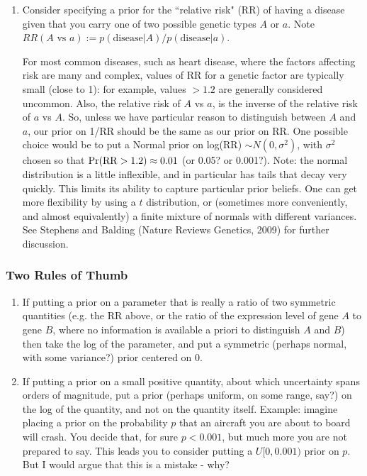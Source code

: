 \documentclass[12pt]{article}
\begin{document}
\begin{enumerate}
  \item Consider specifying a prior for the ``relative risk" (RR) of having a disease given that you carry one of two possible genetic types $A$ or $a$. Note $RR(A \mbox{ vs } a) := p(\mbox{disease} | A)/p(\mbox{disease} | a)$.
  
For most common diseases, such as heart disease, where the factors affecting risk
are many and complex, values of RR for a genetic factor are typically small (close to 1): for example, values $>1.2$ are generally considered uncommon. Also,
the relative risk of $A$ vs $a$, is the inverse of the relative risk of $a$ vs $A$.  So, unless we have particular reason to distinguish between $A$ and $a$, our prior on 1/RR should be the same as our prior on RR. One possible choice would be to put a Normal prior on log(RR) $\sim N(0,\sigma^2)$, with $\sigma^2$ chosen
so that $\Pr({\rm RR} >1.2) \approx 0.01$ (or 0.05? or 0.001?). 
Note: the normal distribution is a little inflexible,
and in particular has tails that decay very quickly.
This limits its ability to capture particular prior beliefs.
One can get more flexibility by using a $t$ distribution, or (sometimes more conveniently, and almost equivalently) a finite mixture of normals with different variances. See Stephens and Balding (Nature Reviews Genetics, 2009) for further discussion.
 \end{enumerate}

\subsubsection{Two Rules of Thumb}
\begin{enumerate}
\item If putting a prior on a parameter that is really a ratio of two symmetric quantities (e.g. the RR above, or the ratio
of the expression level of gene $A$ to gene $B$, where no information is available a priori to distinguish $A$ and $B$) then take the log of the parameter, and put a symmetric (perhaps normal, with some variance?) prior centered on 0.
\item If putting a prior on a small positive quantity, about which uncertainty spans orders of magnitude, put a prior (perhaps uniform, on some range, say?) on the log of the quantity, and not on the quantity itself. Example: imagine placing a prior on the probability $p$ that an aircraft you are about to board will crash. You decide that, for sure $p<0.001$, but much more you are not prepared to say. This leads you 
to consider putting a $U[0,0.001)$ prior on $p$.  But I would argue that this is a mistake - why?
\end{enumerate}
\end{document}
